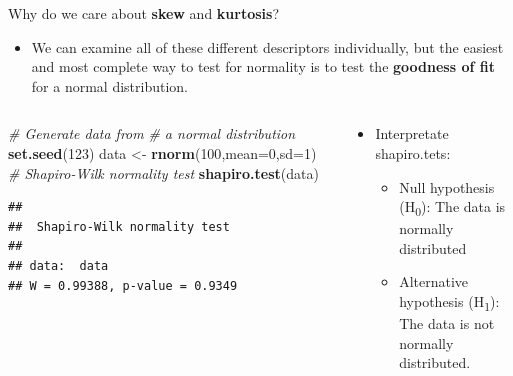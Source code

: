 \documentclass[
  ignorenonframetext,
]{beamer}
\newenvironment{Shaded}{\begin{snugshade}}{\end{snugshade}}
\newcommand{\AttributeTok}[1]{\textcolor[rgb]{0.13,0.29,0.53}{#1}}
\newcommand{\CommentTok}[1]{\textcolor[rgb]{0.56,0.35,0.01}{\textit{#1}}}
\newcommand{\DecValTok}[1]{\textcolor[rgb]{0.00,0.00,0.81}{#1}}
\newcommand{\FunctionTok}[1]{\textcolor[rgb]{0.13,0.29,0.53}{\textbf{#1}}}
\newcommand{\NormalTok}[1]{#1}
\newcommand{\OtherTok}[1]{\textcolor[rgb]{0.56,0.35,0.01}{#1}}
\providecommand{\tightlist}{%
  \setlength{\itemsep}{0pt}\setlength{\parskip}{0pt}}
\begin{document}
\begin{frame}[fragile]{Why do we care about \textbf{skew} and
\textbf{kurtosis}?}
\label{why-do-we-care-about-skew-and-kurtosis-2}
\begin{itemize}
\tightlist
\item
  We can examine all of these different descriptors individually, but
  the easiest and most complete way to test for normality is to test the
  \textbf{goodness of fit} for a normal distribution.
\end{itemize}

\begin{columns}[T]
\begin{column}{0.48\textwidth}
\tiny

\begin{Shaded}
\begin{Highlighting}[]
\CommentTok{\# Generate data from }
\CommentTok{\# a normal distribution}
\FunctionTok{set.seed}\NormalTok{(}\DecValTok{123}\NormalTok{)}
\NormalTok{data }\OtherTok{\textless{}{-}} \FunctionTok{rnorm}\NormalTok{(}\DecValTok{100}\NormalTok{,}\AttributeTok{mean=}\DecValTok{0}\NormalTok{,}\AttributeTok{sd=}\DecValTok{1}\NormalTok{)}
\CommentTok{\# Shapiro{-}Wilk normality test}
\FunctionTok{shapiro.test}\NormalTok{(data)}
\end{Highlighting}
\end{Shaded}

\begin{verbatim}
## 
##  Shapiro-Wilk normality test
## 
## data:  data
## W = 0.99388, p-value = 0.9349
\end{verbatim}

\normalsize
\end{column}

\begin{column}{0.48\textwidth}
\small

\begin{itemize}
\item
  Interpretate shapiro.tets:

  \begin{itemize}
  \item
    Null hypothesis (H\textsubscript{0}): The data is normally
    distributed
  \item
    Alternative hypothesis (H\textsubscript{1}): The data is not
    normally distributed.
  \end{itemize}
\end{itemize}
\end{column}
\end{columns}
\end{frame}
\end{document}
